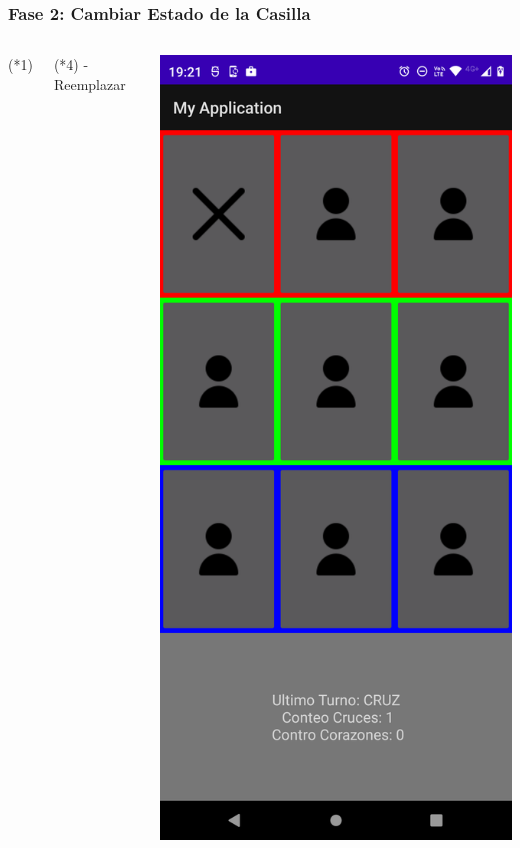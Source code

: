 \begin{frame}[fragile]
\frametitle{Fase 2: Cambiar Estado de la Casilla} 
\begin{columns}
\begin{block}{(*1)}
\inputminted[linenos,fontsize=\tiny]{kotlin}{00_ComportamientoAplicacionTicTacToe/imports_etapa2_fase1.kt}
\end{block}
\begin{block}{(*4) - Reemplazar}
\inputminted[linenos,fontsize=\tiny]{kotlin}{00_ComportamientoAplicacionTicTacToe/listenerVersion1.kt}
\end{block}
\begin{center}
\includegraphics[width=0.95\linewidth]{00_ComportamientoAplicacionTicTacToe/Etapa2_Fase2A.png}    

\end{center}
\end{columns}
\end{frame}
